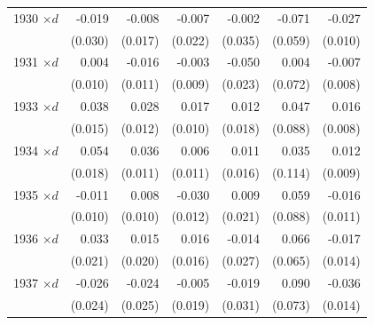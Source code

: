 {\begin{tabular}{l*{6}{D{.}{.}{-1}}}
1930 \ensuremath{\times d}&      -0.019         &      -0.008         &      -0.007         &      -0.002         &      -0.071         &      -0.027\sym{**} \\
                    &     (0.030)         &     (0.017)         &     (0.022)         &     (0.035)         &     (0.059)         &     (0.010)         \\
1931 \ensuremath{\times d}&       0.004         &      -0.016         &      -0.003         &      -0.050\sym{*}  &       0.004         &      -0.007         \\
                    &     (0.010)         &     (0.011)         &     (0.009)         &     (0.023)         &     (0.072)         &     (0.008)         \\
1933 \ensuremath{\times d}&       0.038\sym{**} &       0.028\sym{**} &       0.017         &       0.012         &       0.047         &       0.016\sym{*}  \\
                    &     (0.015)         &     (0.012)         &     (0.010)         &     (0.018)         &     (0.088)         &     (0.008)         \\
1934 \ensuremath{\times d}&       0.054\sym{***}&       0.036\sym{***}&       0.006         &       0.011         &       0.035         &       0.012         \\
                    &     (0.018)         &     (0.011)         &     (0.011)         &     (0.016)         &     (0.114)         &     (0.009)         \\
1935 \ensuremath{\times d}&      -0.011         &       0.008         &      -0.030\sym{**} &       0.009         &       0.059         &      -0.016         \\
                    &     (0.010)         &     (0.010)         &     (0.012)         &     (0.021)         &     (0.088)         &     (0.011)         \\
1936 \ensuremath{\times d}&       0.033         &       0.015         &       0.016         &      -0.014         &       0.066         &      -0.017         \\
                    &     (0.021)         &     (0.020)         &     (0.016)         &     (0.027)         &     (0.065)         &     (0.014)         \\
1937 \ensuremath{\times d}&      -0.026         &      -0.024         &      -0.005         &      -0.019         &       0.090         &      -0.036\sym{**} \\
                    &     (0.024)         &     (0.025)         &     (0.019)         &     (0.031)         &     (0.073)         &     (0.014)         \\

\end{tabular}}
